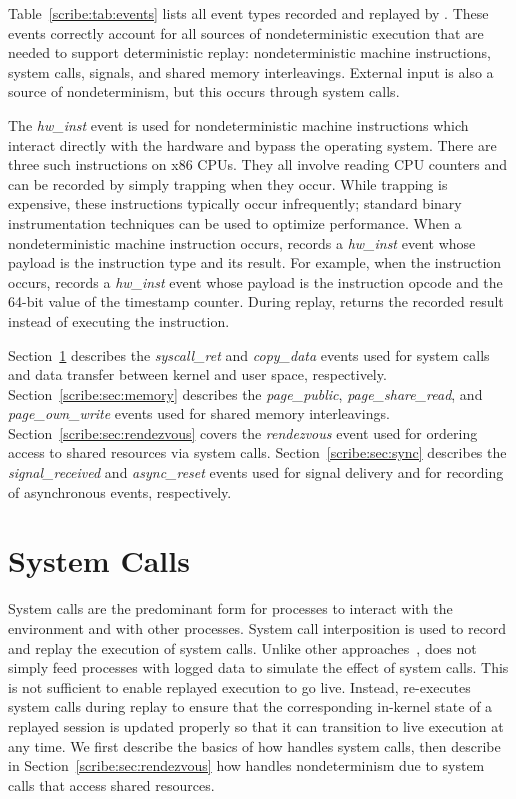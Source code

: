 Table~\ref{scribe:tab:events} lists all
event types recorded and replayed by \scribe{}.  These events
correctly account for all sources of nondeterministic execution that
are needed to support deterministic replay: nondeterministic machine
instructions, system calls, signals, and shared memory interleavings.
External input is also a source of nondeterminism, but this occurs
through system calls.

The {\em hw\_inst} event is used for nondeterministic machine
instructions which interact directly with the hardware and bypass the
operating system.  There are three such instructions on x86 CPUs.
They all involve reading CPU counters and can be recorded by simply
trapping when they occur.  While trapping is expensive, these
instructions typically occur infrequently; standard binary
instrumentation techniques can be used to optimize performance. 
When a nondeterministic machine instruction occurs, \scribe{} records
a {\em hw\_inst} event whose payload is the instruction type and
its result.  For example, when the  instruction occurs,
\scribe{} records a {\em hw\_inst} event whose payload is the
 instruction opcode and the 64-bit value of the timestamp
counter.  During replay, \scribe{} returns the recorded result
instead of executing the instruction.

Section~\ref{scribe:sec:syscalls} describes the {\em syscall\_ret} and {\em
  copy\_data} events used for system calls and data transfer between
kernel and user space,
respectively.
Section~\ref{scribe:sec:memory} describes the {\em page\_public}, {\em
  page\_share\_read}, and {\em page\_own\_write} events used for
shared memory interleavings.  Section~\ref{scribe:sec:rendezvous} covers
the {\em rendezvous} event used for ordering access to shared
resources via system calls. Section~\ref{scribe:sec:sync} describes the {\em
  signal\_received} and {\em async\_reset} events used for signal
delivery and for recording of asynchronous events, respectively.

 	
  

\section{System Calls}
\label{scribe:sec:syscalls}

System calls are the predominant form for processes to interact with
the environment and with other processes. System call interposition is
used to record and replay the execution of system calls.
Unlike other approaches~\cite{liblog,jockey,flashback}, \scribe{} does
not simply feed processes with logged data to simulate the effect of
system calls.  This is not sufficient to enable replayed execution to
go live.  Instead, \scribe{} re-executes system calls during replay to
ensure that the corresponding in-kernel state of a replayed session is
updated properly so that it can transition to live execution at any
time.  We first describe the basics of how \scribe{} handles system
calls, then describe in Section~\ref{scribe:sec:rendezvous} how \scribe{}
handles nondeterminism due to system calls that access shared
resources. 

